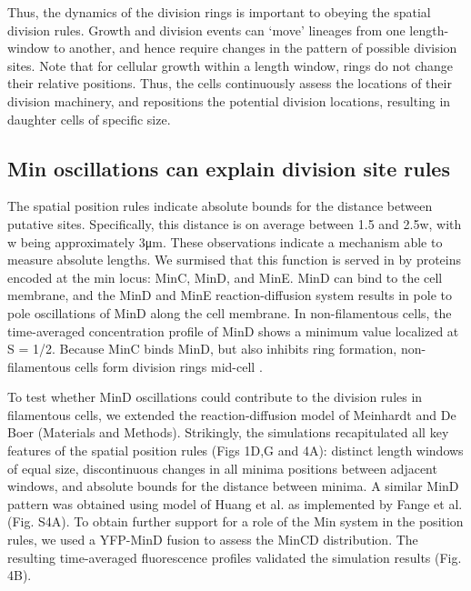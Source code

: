 Thus, the dynamics of the division rings is important to obeying the spatial division rules. Growth and division events can ‘move’ lineages from one length-window to another, and hence require changes in the pattern of possible division sites. Note that for cellular growth within a length window, rings do not change their relative positions. Thus, the cells continuously assess the locations of their division machinery, and repositions the potential division locations, resulting in daughter cells of specific size. 

\subsection{Min oscillations can explain division site rules}
The spatial position rules indicate absolute bounds for the distance between putative sites. Specifically, this distance is on average between 1.5 and 2.5w, with w being approximately 3μm. These observations indicate a mechanism able to measure absolute lengths. We surmised that this function is served in \ecoli by proteins encoded at the min locus: MinC, MinD, and MinE. MinD can bind to the cell membrane, and the MinD and MinE reaction-diffusion system results in pole to pole oscillations of MinD along the cell membrane. In non-filamentous cells, the time-averaged concentration profile of MinD shows a minimum value localized at S = 1/2. Because MinC binds MinD, but also inhibits ring formation, non-filamentous cells form division rings mid-cell \cite{Loose2011, Raskin1999}. 

To test whether MinD oscillations could contribute to the division rules in filamentous cells, we extended the reaction-diffusion model of Meinhardt and De Boer \cite{Meinhardt2001} (Materials and Methods). Strikingly, the simulations recapitulated all key features of the spatial position rules (Figs 1D,G and 4A): distinct length windows of equal size, discontinuous changes in all minima positions between adjacent windows, and absolute bounds for the distance between minima. A similar MinD pattern was obtained using model of Huang et al. \cite{Huang2003} as implemented by Fange et al. \cite{Hattne2005, Fange2006} (Fig. S4A). To obtain further support for a role of the Min system in the position rules, we used a YFP-MinD fusion to assess the MinCD distribution. The resulting time-averaged fluorescence profiles validated the simulation results (Fig. 4B). 

